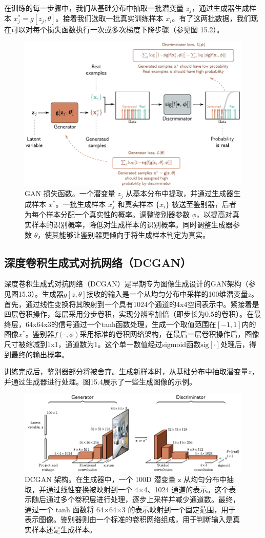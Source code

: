 \documentclass[lang=cn,newtx,10pt,scheme=chinese]{elegantbook}
\begin{document}
在训练的每一步骤中，我们从基础分布中抽取一批潜变量 \(z_j\)，通过生成器生成样本 \(x_j^* = g[z_j, \theta]\)。接着我们选取一批真实训练样本 \(x_i\)。有了这两批数据，我们现在可以对每个损失函数执行一次或多次梯度下降步骤（参见图 15.2）。

\begin{figure}[ht!]
\centering
\includegraphics[width=0.7\linewidth]{PDFFigures/UDLChap15PDF/GanDiscrimGen.pdf}
\caption{GAN 损失函数。一个潜变量 \(z_j\) 从基本分布中提取，并通过生成器生成样本 \( x^* \)。一批生成样本 \( x_j^* \) 和真实样本 \(\{x_i\}\) 被送至鉴别器，后者为每个样本分配一个真实性的概率。调整鉴别器参数 \(\phi\)，以提高对真实样本的识别概率，降低对生成样本的识别概率。同时调整生成器参数 \(\theta\)，使其能够让鉴别器更倾向于将生成样本判定为真实。}
\end{figure}


\subsection{深度卷积生成式对抗网络（DCGAN）}
深度卷积生成式对抗网络（DCGAN）是早期专为图像生成设计的GAN架构（参见图15.3）。生成器\(g[z, \theta]\)接收的输入是一个从均匀分布中采样的100维潜变量\(z\)。首先，通过线性变换将其映射到一个具有1024个通道的4x4空间表示中。紧接着是四层卷积操作，每层采用分步卷积，实现分辨率加倍（即步长为0.5的卷积）。在最终层，64x64x3的信号通过一个tanh函数处理，生成一个取值范围在\([-1, 1]\)内的图像\(x^*\)。鉴别器\(f(\cdot, \phi)\)采用标准的卷积网络架构，在最后一层卷积操作后，图像尺寸被缩减到1x1，通道数为1。这个单一数值经过sigmoid函数\(\text{sig}[\cdot]\)处理后，得到最终的输出概率。

训练完成后，鉴别器部分将被舍弃。生成新样本时，从基础分布中抽取潜变量\(z\)，并通过生成器进行处理。图15.4展示了一些生成图像的示例。

\begin{figure}[ht!]
\centering
\includegraphics[width=0.7\linewidth]{PDFFigures/UDLChap15PDF/GanDCGANArch.pdf}
\caption{DCGAN 架构。在生成器中，一个 100D 潜变量 z 从均匀分布中抽取，并通过线性变换被映射到一个 4×4、1024 通道的表示。这个表示随后通过多个卷积层进行处理，逐步上采样并减少通道数。最终，通过一个 tanh 函数将 64×64×3 的表示映射到一个固定范围，用于表示图像。鉴别器则由一个标准的卷积网络组成，用于判断输入是真实样本还是生成样本。}
\end{figure}
\end{document}
